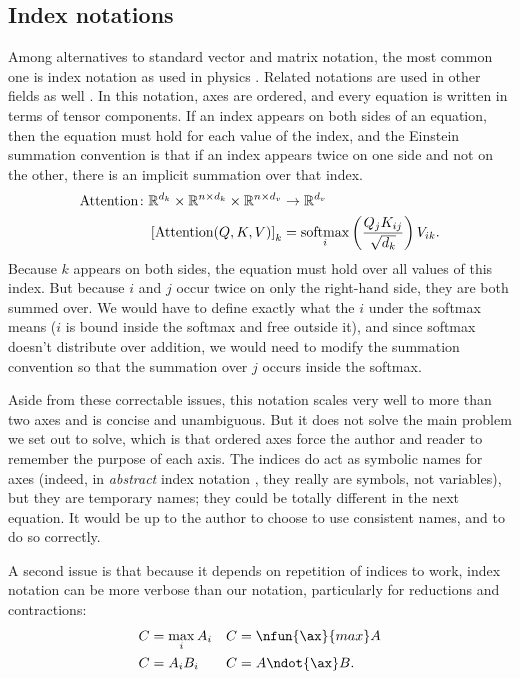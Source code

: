 \subsection{Index notations}

Among alternatives to standard vector and matrix notation, the most common one is index notation as used in physics \citep{ricci+levi-civita:1901}. 
Related notations are used in other fields as well \citep{harshman:2001}.
In this notation, axes are ordered, and every equation is written in terms of tensor components.
If an index appears on both sides of an equation, then the equation must hold for each value of the index, and the Einstein summation convention \citep{einstein:1916} is that if an index appears twice on one side and not on the other, there is an implicit summation over that index.
\begin{align*}
  \text{Attention} \colon \mathbb{R}^{d_k} \times \mathbb{R}^{n \times d_k} \times \mathbb{R}^{n \times d_v} &\rightarrow \mathbb{R}^{d_v} \\
  \left[\text{Attention}(Q, K, V)\right]_{k} &= \operatorname*{softmax}_i \left( \frac{Q_{j} K_{ij}}{\sqrt{d_k}} \right) V_{ik}.
\end{align*}
Because $k$ appears on both sides, the equation must hold over all values of this index. But because $i$ and $j$ occur twice on only the right-hand side, they are both summed over. We would have to define exactly what the $i$ under the softmax means ($i$ is bound inside the softmax and free outside it), and since softmax doesn't distribute over addition, we would need to modify the summation convention so that the summation over $j$ occurs inside the softmax.

Aside from these correctable issues, this notation scales very well to more than two axes and is concise and unambiguous. But it does not solve the main problem we set out to solve, which is that ordered axes force the author and reader to remember the purpose of each axis. The indices do act as symbolic names for axes (indeed, in \emph{abstract} index notation \citep{penrose+rindler:1984}, they really are symbols, not variables), but they are temporary names; they could be totally different in the next equation. It would be up to the author to choose to use consistent names, and to do so correctly.

A second issue is that because it depends on repetition of indices to work, index notation can be more verbose than our notation, particularly for reductions and contractions:
\begin{align*}
  C &= \max_i A_i & C &=\nfun{\ax}{max} A \\
  C &= A_i B_i & C &= A \ndot{\ax} B.
\end{align*}

